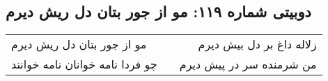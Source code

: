 \begin{center}
\section*{دوبیتی شماره ۱۱۹: مو از جور بتان دل ریش دیرم}
\label{sec:119}
\begin{longtable}{l p{0.5cm} r}
مو از جور بتان دل ریش دیرم
&&
زلاله داغ بر دل بیش دیرم
\\
چو فردا نامه خوانان نامه خوانند
&&
من شرمنده سر در پیش دیرم
\\
\end{longtable}
\end{center}

